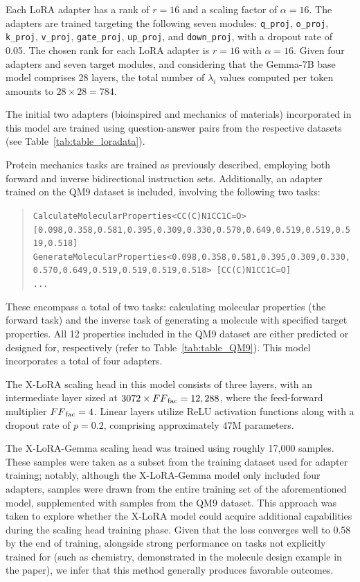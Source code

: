 Each LoRA adapter has a rank of $r=16$ and a scaling factor of $\alpha=16$. The adapters are trained targeting the following seven modules: \texttt{q\_proj}, \texttt{o\_proj}, \texttt{k\_proj}, \texttt{v\_proj}, \texttt{gate\_proj}, \texttt{up\_proj}, and \texttt{down\_proj}, with a dropout rate of 0.05. The chosen rank for each LoRA adapter is $r=16$ with $\alpha=16$. Given four adapters and seven target modules, and considering that the Gemma-7B base model comprises 28 layers, the total number of $\lambda_i$ values computed per token amounts to $28 \times 28 = 784$.

The initial two adapters (bioinspired and mechanics of materials) incorporated in this model are trained using question-answer pairs from the respective datasets (see Table~\ref{tab:table_loradata}).

Protein mechanics tasks are trained as previously described, employing both forward and inverse bidirectional instruction sets. Additionally, an adapter trained on the QM9 dataset is included, involving the following two tasks:

\begin{quote}
\tiny {\texttt{CalculateMolecularProperties<CC(C)N1CC1C=O> [0.098,0.358,0.581,0.395,0.309,0.330,0.570,0.649,0.519,0.519,0.519,0.518]\\
GenerateMolecularProperties<0.098,0.358,0.581,0.395,0.309,0.330,0.570,0.649,0.519,0.519,0.519,0.518> [CC(C)N1CC1C=O]\\ 
...
}}
\end{quote}

These encompass a total of two tasks: calculating molecular properties (the forward task) and the inverse task of generating a molecule with specified target properties. All 12 properties included in the QM9 dataset are either predicted or designed for, respectively (refer to Table~\ref{tab:table_QM9}).  
This model incorporates a total of four adapters.  

The X-LoRA scaling head in this model consists of three layers, with an intermediate layer sized at $3072\times {FF}_{\rm fac}=12,288$, where the feed-forward multiplier ${FF}_{\rm fac}=4$. Linear layers utilize ReLU activation functions along with a dropout rate of $p=0.2$, comprising approximately 47M parameters.  

The X-LoRA-Gemma scaling head was trained using roughly 17,000 samples. These samples were taken as a subset from the training dataset used for adapter training; notably, although the X-LoRA-Gemma model only included four adapters, samples were drawn from the entire training set of the aforementioned model, supplemented with samples from the QM9 dataset. This approach was taken to explore whether the X-LoRA model could acquire additional capabilities during the scaling head training phase. Given that the loss converges well to 0.58 by the end of training, alongside strong performance on tasks not explicitly trained for (such as chemistry, demonstrated in the molecule design example in the paper), we infer that this method generally produces favorable outcomes.

